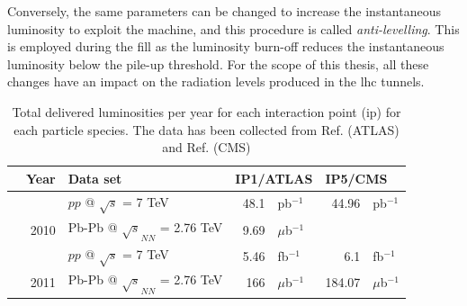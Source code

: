 \documentclass[encoding=utf8,british]{tumphthesis}
\begin{document}
Conversely, the same parameters can be changed to increase the instantaneous luminosity to exploit the machine, and this procedure is called \emph{anti-levelling}. This is employed during the fill as the luminosity burn-off reduces the instantaneous luminosity below the pile-up threshold. For the scope of this thesis, all these changes have an impact on the radiation levels produced in the \acrshort{lhc} tunnels.




\begin{table}[H]
\centering
\caption{Total delivered luminosities per year for each interaction point (\acrshort{ip}) for each particle species. The data has been collected from Ref. \cite{Luminosities:ATLAS} (ATLAS) and Ref. \cite{Luminosities:CMS} (CMS)}
\label{tab:IP-luminosities}
\begin{tabular}{|c|r|l|rl|rl|}
\hline
\rowcolor[HTML]{CFE2F3} 
\multicolumn{1}{|l}{\cellcolor[HTML]{CFE2F3}Run}     & \multicolumn{1}{|l|}{\cellcolor[HTML]{CFE2F3}Year}   & Data set                                                           & \multicolumn{2}{|l}{\cellcolor[HTML]{CFE2F3}IP1/ATLAS}                & \multicolumn{2}{|l|}{\cellcolor[HTML]{CFE2F3}IP5/CMS}  \\ \hline
                                                 &                                                & $pp$ @ $\sqrt{s}$ = 7 TeV                                          & 48.1                         & pb$^{-1}$                             & 44.96                                        & pb$^{-1}$  \\
                                                 & \multirow{-2}{*}{2010}                         & \cellcolor[HTML]{CFE2F3}Pb-Pb @ $\sqrt{s}_{NN}$ = 2.76 TeV & \cellcolor[HTML]{CFE2F3}9.69 & \cellcolor[HTML]{CFE2F3}$\mu$b$^{-1}$ & \multicolumn{1}{l}{\cellcolor[HTML]{CFE2F3}} & \cellcolor[HTML]{CFE2F3}               \\
                                                 & \cellcolor[HTML]{CFE2F3}                       & $pp$ @ $\sqrt{s}$ = 7 TeV                                          & 5.46                         & fb$^{-1}$                             & 6.1                                          & fb$^{-1}$                              \\
                                                 & \multirow{-2}{*}{\cellcolor[HTML]{CFE2F3}2011} & \cellcolor[HTML]{CFE2F3}Pb-Pb @ $\sqrt{s}_{NN}$ = 2.76 TeV & \cellcolor[HTML]{CFE2F3}166  & \cellcolor[HTML]{CFE2F3}$\mu$b$^{-1}$ & \cellcolor[HTML]{CFE2F3}184.07               & \cellcolor[HTML]{CFE2F3}$\mu$b$^{-1}$  \\

\end{tabular}
\end{table}
\end{document}
